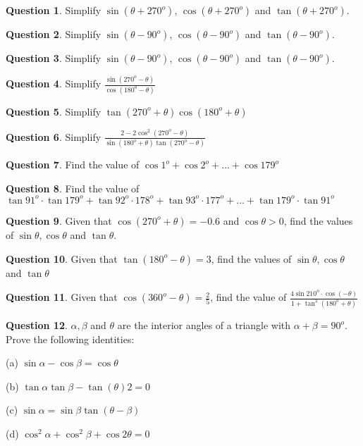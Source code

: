 \documentclass{article}
\theoremstyle{definition}
\newtheorem{question}{Question}
\begin{document}
\begin{question}
 Simplify $\sin(\theta+270^o)$, $\cos(\theta+270^o)$ and $\tan(\theta+270^o)$.
\end{question}
\begin{question}
 Simplify $\sin(\theta-90^o)$, $\cos(\theta-90^o)$ and $\tan(\theta-90^o)$.
\end{question}
\begin{question}
 Simplify $\sin(\theta-90^o)$, $\cos(\theta-90^o)$ and $\tan(\theta-90^o)$.
\end{question}
\begin{question}
 Simplify $\frac{\sin(270^o - \theta)}{\cos(180^o-\theta)}$
\end{question}
\begin{question}
 Simplify $\tan(270^o+\theta) \cos(180^o+\theta)$
\end{question}
\begin{question}
 Simplify $\frac{2-2\cos^2(270^o-\theta)}{\sin(180^o+\theta)\tan(270^o-\theta)}$
\end{question}
\begin{question}
 Find the value of $\cos 1^o + \cos 2^o + ... + \cos 179^o$
\end{question}
\begin{question}
 Find the value of $\tan 91^o \cdot \tan 179^o + \tan 92^o \cdot 178^o + \tan 93^o \cdot 177^o + ... + \tan 179^o \cdot \tan 91^o$
\end{question}
\begin{question}
 Given that $\cos (270^o + \theta) = -0.6$ and $\cos \theta > 0$, find the values of $\sin \theta, \cos \theta$ and $\tan \theta$.
\end{question}
\begin{question}
 Given that $\tan (180^o - \theta) = 3$, find the values of $\sin \theta, \cos \theta$ and $\tan \theta$
\end{question}
\begin{question}
 Given that $\cos (360^o - \theta) = \frac{2}{5}$, find the value of $\frac{4 \sin 210^o \cdot \cos (-\theta)}{1 + \tan^2(180^o + \theta)}$
\end{question}
\begin{question}
 $\alpha, \beta$ and $\theta$ are the interior angles of a triangle with $\alpha + \beta = 90^o$. Prove the following identities:

	(a) $\sin \alpha - \cos \beta = \cos \theta$

	(b) $\tan \alpha \tan \beta - \tan (\theta){2} = 0$

	(c) $\sin \alpha = \sin \beta \tan (\theta - \beta)$

	(d) $\cos^2 \alpha + \cos^2 \beta + \cos 2\theta = 0$
\end{question}
\end{document}

